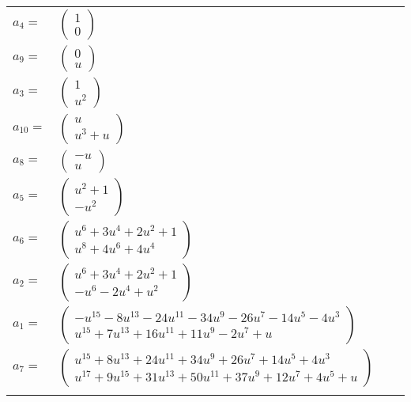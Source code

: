 \documentclass[1p]{elsarticle_modified}
\theoremstyle{definition}
\begin{document}
\begin{tabular}{m{7pt} m{180pt} m{7pt} m{180pt} }
\flushright $a_{4}=$&$\begin{pmatrix}1\\0\end{pmatrix}$ \\
\flushright $a_{9}=$&$\begin{pmatrix}0\\u\end{pmatrix}$ \\
\flushright $a_{3}=$&$\begin{pmatrix}1\\u^2\end{pmatrix}$ \\
\flushright $a_{10}=$&$\begin{pmatrix}u\\u^3+u\end{pmatrix}$ \\
\flushright $a_{8}=$&$\begin{pmatrix}- u\\u\end{pmatrix}$ \\
\flushright $a_{5}=$&$\begin{pmatrix}u^2+1\\- u^2\end{pmatrix}$ \\
\flushright $a_{6}=$&$\begin{pmatrix}u^6+3 u^4+2 u^2+1\\u^8+4 u^6+4 u^4\end{pmatrix}$ \\
\flushright $a_{2}=$&$\begin{pmatrix}u^6+3 u^4+2 u^2+1\\- u^6-2 u^4+u^2\end{pmatrix}$ \\
\flushright $a_{1}=$&$\begin{pmatrix}- u^{15}-8 u^{13}-24 u^{11}-34 u^9-26 u^7-14 u^5-4 u^3\\u^{15}+7 u^{13}+16 u^{11}+11 u^9-2 u^7+u\end{pmatrix}$ \\
\flushright $a_{7}=$&$\begin{pmatrix}u^{15}+8 u^{13}+24 u^{11}+34 u^9+26 u^7+14 u^5+4 u^3\\u^{17}+9 u^{15}+31 u^{13}+50 u^{11}+37 u^9+12 u^7+4 u^5+u\end{pmatrix}$\\&\end{tabular}
\end{document}
